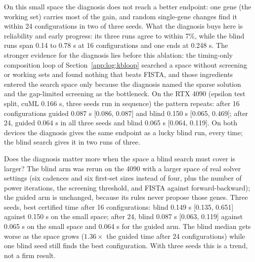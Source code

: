 On this small space the diagnosis does not reach a better endpoint: one gene
(the working set) carries most of the gain, and random single-gene changes find
it within 24 configurations in two of three seeds. What the diagnosis buys here
is reliability and early progress: its three runs agree to within 7\%, while the
blind runs span 0.14 to 0.78 s at 16 configurations and one ends at 0.248 s. The
stronger evidence for the diagnosis lies before this ablation: the timing-only
composition loop of Section~\ref{app:log:kbloop} searched a space without
screening or working sets and found nothing that beats FISTA, and those
ingredients entered the search space only because the diagnosis named the
sparse solution and the gap-limited screening as the bottleneck. On the RTX 4090
(epsilon test split, cuML 0.166 s, three seeds run in sequence) the pattern
repeats: after 16 configurations guided 0.087 s [0.086, 0.087] and blind
0.150 s [0.065, 0.469]; after 24, guided 0.064 s in all three seeds and blind
0.065 s [0.064, 0.119]. On both devices the diagnosis gives the same endpoint
as a lucky blind run, every time; the blind search gives it in two runs of three.

Does the diagnosis matter more when the space a blind search must cover is
larger? The blind arm was rerun on the 4090 with a larger space of real solver
settings (six cadences and six first-set sizes instead of four, plus the number
of power iterations, the screening threshold, and FISTA against
forward-backward); the guided arm is unchanged, because its rules never propose
those genes. Three seeds, best certified time after 16 configurations: blind
0.149 s [0.135, 0.651] against 0.150 s on the small space; after 24, blind 0.087 s
[0.063, 0.119] against 0.065 s on the small space and 0.064 s for the guided arm.
The blind median gets worse as the space grows ($1.36\times$ the guided time after
24 configurations) while one blind seed still finds the best configuration. With
three seeds this is a trend, not a firm result.

